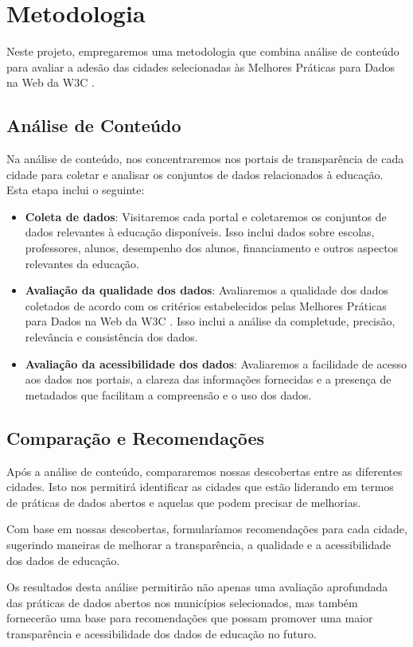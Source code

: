 \chapter{Metodologia}

Neste projeto, empregaremos uma metodologia que combina análise de conteúdo para avaliar a adesão das cidades selecionadas às Melhores Práticas para Dados na Web da W3C \cite{W3C}.

\section{Análise de Conteúdo}

Na análise de conteúdo, nos concentraremos nos portais de transparência de cada cidade para coletar e analisar os conjuntos de dados relacionados à educação. Esta etapa inclui o seguinte:

\begin{itemize}
    \item \textbf{Coleta de dados}: Visitaremos cada portal \cite{SP} \cite{CU} \cite{SA} \cite{MA} \cite{CG} e coletaremos os conjuntos de dados relevantes à educação disponíveis. Isso inclui dados sobre escolas, professores, alunos, desempenho dos alunos, financiamento e outros aspectos relevantes da educação.
    \item \textbf{Avaliação da qualidade dos dados}: Avaliaremos a qualidade dos dados coletados de acordo com os critérios estabelecidos pelas Melhores Práticas para Dados na Web da W3C \cite{W3CSUMMARY}. Isso inclui a análise da completude, precisão, relevância e consistência dos dados.
    \item \textbf{Avaliação da acessibilidade dos dados}: Avaliaremos a facilidade de acesso aos dados nos portais, a clareza das informações fornecidas e a presença de metadados que facilitam a compreensão e o uso dos dados.
\end{itemize}

\section{Comparação e Recomendações}

Após a análise de conteúdo, compararemos nossas descobertas entre as diferentes cidades. Isto nos permitirá identificar as cidades que estão liderando em termos de práticas de dados abertos e aquelas que podem precisar de melhorias.

Com base em nossas descobertas, formularíamos recomendações para cada cidade, sugerindo maneiras de melhorar a transparência, a qualidade e a acessibilidade dos dados de educação.

Os resultados desta análise permitirão não apenas uma avaliação aprofundada das práticas de dados abertos nos municípios selecionados, mas também fornecerão uma base para recomendações que possam promover uma maior transparência e acessibilidade dos dados de educação no futuro.

